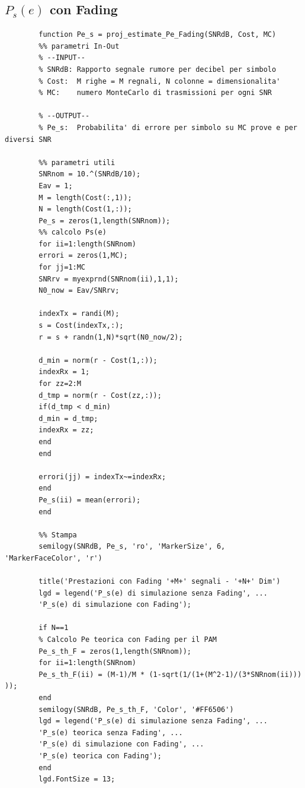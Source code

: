 \documentclass[12pt, a4paper]{article}
\begin{document}
	\subsection{\(P_s(e)\) con Fading}
	\begin{lstlisting}
		function Pe_s = proj_estimate_Pe_Fading(SNRdB, Cost, MC)
		%% parametri In-Out
		% --INPUT--
		% SNRdB: Rapporto segnale rumore per decibel per simbolo
		% Cost:  M righe = M regnali, N colonne = dimensionalita'
		% MC:    numero MonteCarlo di trasmissioni per ogni SNR
		
		% --OUTPUT--
		% Pe_s:  Probabilita' di errore per simbolo su MC prove e per diversi SNR
		
		%% parametri utili
		SNRnom = 10.^(SNRdB/10);
		Eav = 1;
		M = length(Cost(:,1));
		N = length(Cost(1,:));
		Pe_s = zeros(1,length(SNRnom));
		%% calcolo Ps(e)
		for ii=1:length(SNRnom)
		errori = zeros(1,MC);
		for jj=1:MC
		SNRrv = myexprnd(SNRnom(ii),1,1);
		N0_now = Eav/SNRrv;
		
		indexTx = randi(M);
		s = Cost(indexTx,:);
		r = s + randn(1,N)*sqrt(N0_now/2);
		
		d_min = norm(r - Cost(1,:));
		indexRx = 1;
		for zz=2:M
		d_tmp = norm(r - Cost(zz,:));
		if(d_tmp < d_min)
		d_min = d_tmp;
		indexRx = zz;
		end           
		end
		
		errori(jj) = indexTx~=indexRx; 
		end
		Pe_s(ii) = mean(errori);
		end
		
		%% Stampa 
		semilogy(SNRdB, Pe_s, 'ro', 'MarkerSize', 6, 'MarkerFaceColor', 'r')
		
		title('Prestazioni con Fading '+M+' segnali - '+N+' Dim')
		lgd = legend('P_s(e) di simulazione senza Fading', ...
		'P_s(e) di simulazione con Fading');
		
		if N==1
		% Calcolo Pe teorica con Fading per il PAM
		Pe_s_th_F = zeros(1,length(SNRnom));
		for ii=1:length(SNRnom)
		Pe_s_th_F(ii) = (M-1)/M * (1-sqrt(1/(1+(M^2-1)/(3*SNRnom(ii))) ));
		end
		semilogy(SNRdB, Pe_s_th_F, 'Color', '#FF6506')
		lgd = legend('P_s(e) di simulazione senza Fading', ...
		'P_s(e) teorica senza Fading', ...
		'P_s(e) di simulazione con Fading', ...
		'P_s(e) teorica con Fading');
		end
		lgd.FontSize = 13;
	\end{lstlisting}
\end{document}
